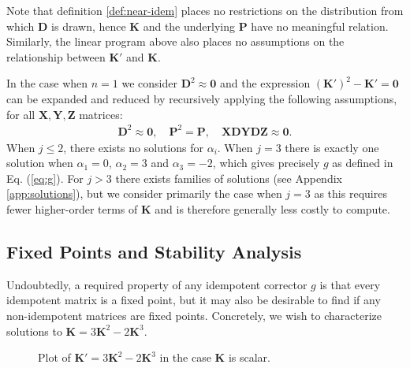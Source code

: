 \documentclass{article}
\theoremstyle{plain}
\theoremstyle{definition}
\theoremstyle{remark}
\newcommand{\vD}{\mathbf{D}}
\newcommand{\vK}{\mathbf{K}}
\newcommand{\vP}{\mathbf{P}}
\newcommand{\vX}{\mathbf{X}}
\newcommand{\vY}{\mathbf{Y}}
\newcommand{\vZ}{\mathbf{Z}}
\begin{document}
Note that definition \ref{def:near-idem} places no restrictions on the distribution from which $\vD$ is drawn, hence $\vK$ and the underlying $\vP$ have no meaningful relation. Similarly, the linear program above also places no assumptions on the relationship between $\vK'$ and $\vK$.

In the case when $n=1$ we consider ${\vD^2 \approx \bm{0}}$ and the expression ${(\vK')^2 - \vK' = \bm{0}}$ can be expanded and reduced by recursively applying the following assumptions, for all $\vX,\vY,\vZ$ matrices:
%
\begin{align}
    \vD^2 \approx \bm{0}, \quad \vP^2 = \vP, \quad \vX \vD \vY \vD \vZ \approx \bm{0}.
\end{align}
%
When $j\leq2$, there exists no solutions for $\alpha_i$. When $j=3$ there is exactly one solution when ${\alpha_1 = 0}$, ${\alpha_2 = 3}$ and ${\alpha_3 = -2}$, which gives precisely $g$ as defined in Eq. (\ref{eq:g}). For $j>3$ there exists families of solutions (see Appendix \ref{app:solutions}), but we consider primarily the case when $j=3$ as this requires fewer higher-order terms of $\vK$ and is therefore generally less costly to compute.

\subsection{Fixed Points and Stability Analysis}
\label{sec:method-fixed-stab}
Undoubtedly, a required property of any idempotent corrector $g$ is that every idempotent matrix is a fixed point, but it may also be desirable to find if any non-idempotent matrices are fixed points. Concretely, we wish to characterize solutions to ${\vK = 3 \vK^2 - 2 \vK^3}$.

\begin{figure}[t]
    \centering
    \caption{Plot of $\vK' = 3 \vK^2 - 2 \vK^3$ in the case $\vK$ is scalar.}
    \label{fig:plot-g}
\end{figure}
\end{document}
